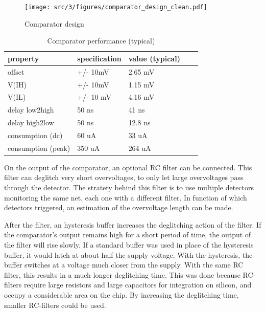 \begin{figure}[!h]
  \centering
  \texttt{[image: src/3/figures/comparator\_design\_clean.pdf]}
  \caption{Comparator design}
  \label{fig:comparator-design}
\end{figure}


\begin{table}[!h]
\centering
\begin{tabular}{@{}lllll@{}}
\toprule
property           & specification & value (typical) \\
\midrule
offset             & +/- 10mV      & 2.65 mV \\
V(IH)              & +/- 10mV      & 1.15 mV \\
V(IL)              & +/- 10 mV     & 4.16 mV \\
delay low2high     & 50 ns         & 41 ns   \\
delay high2low     & 50 ns         & 12.8 ns \\
consumption (dc)   & 60 uA         & 33 uA \\
consumption (peak) & 350 uA        & 264 uA \\
\bottomrule
\end{tabular}
\caption{Comparator performance (typical)}
\label{tab:comparator-performance}
\end{table}


On the output of the comparator, an optional RC filter can be connected.
This filter can deglitch very short overvoltages, to only let large overvoltages pass through the detector.
The stratety behind this filter is to use multiple detectors monitoring the same net, each one with a different filter.
In function of which detectors triggered, an estimation of the overvoltage length can be made.

After the filter, an hysteresis buffer increases the deglitching action of the filter.
If the comparator's output remains high for a short period of time, the output of the filter will rise slowly.
If a standard buffer was used in place of the hysteresis buffer, it would latch at about half the supply voltage.
With the hysteresis, the buffer switches at a voltage much closer from the supply.
With the same RC filter, this results in a much longer deglitching time.
This was done because RC-filters require large resistors and large capacitors for integration on silicon, and occupy a considerable area on the chip.
By increasing the deglitching time, smaller RC-filters could be used.

